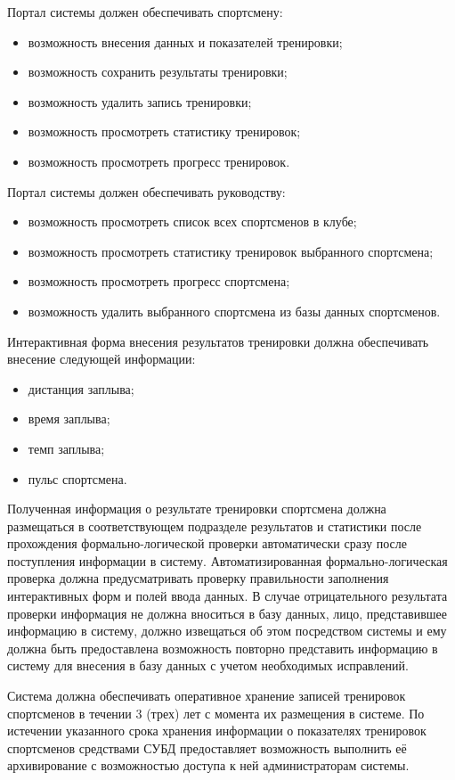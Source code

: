 \documentclass[14pt]{extreport}
\begin{document}
Портал системы должен обеспечивать спортсмену:
\begin{itemize}
\item возможность внесения данных и показателей тренировки;
\item возможность сохранить результаты тренировки;
\item возможность удалить запись тренировки;
\item возможность просмотреть статистику тренировок;
\item возможность просмотреть прогресс тренировок. 
\end{itemize}

Портал системы должен обеспечивать руководству:
\begin{itemize}
\item возможность просмотреть список всех спортсменов в клубе;
\item возможность просмотреть статистику тренировок выбранного спортсмена;
\item возможность просмотреть прогресс спортсмена;
\item возможность удалить выбранного спортсмена из базы данных спортсменов.
\end{itemize}

Интерактивная форма внесения результатов тренировки должна обеспечивать внесение следующей информации:
\begin{itemize}
\item дистанция заплыва;
\item время заплыва;
\item темп заплыва;
\item пульс спортсмена.
\end{itemize}

Полученная информация о результате тренировки спортсмена должна размещаться в соответствующем подразделе результатов и статистики после прохождения формально-логической проверки автоматически сразу после поступления информации в систему. Автоматизированная формально-логическая проверка должна предусматривать проверку правильности заполнения интерактивных форм и полей ввода данных. В случае отрицательного результата проверки информация не должна вноситься в базу данных, лицо,
представившее информацию в систему, должно извещаться об этом
посредством системы и ему должна быть предоставлена возможность повторно
представить информацию в систему для внесения в базу данных с учетом
необходимых исправлений.

Система должна обеспечивать оперативное хранение записей тренировок спортсменов в течении 3 (трех) лет с момента их размещения в системе. По истечении указанного срока хранения информации о показателях тренировок спортсменов средствами СУБД предоставляет возможность выполнить её архивирование с возможностью доступа к ней администраторам системы.
\end{document}

